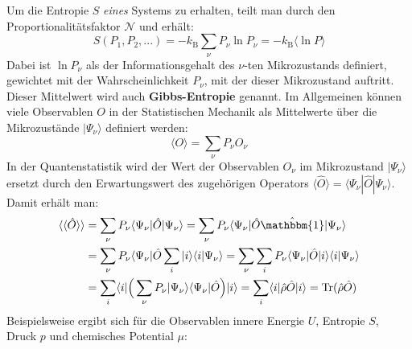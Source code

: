 \documentclass[9pt]{report}
\begin{document}
Um die Entropie $S$ \textit{eines} Systems zu erhalten, teilt man durch den Proportionalitätsfaktor $\mathcal{N}$ und erhält:
\begin{equation}
S(P_1,P_2,...) =-k_{\mathrm{B}}\sum_{\nu}P_{\nu}\ln P_{\nu}=-k_{\mathrm{B}}\big\langle\ln P\big\rangle\label{Entropy formula}
\end{equation}
Dabei ist $\ln P_{\nu}$ als der Informationsgehalt des $\nu$-ten Mikrozustands definiert, gewichtet mit der Wahrscheinlichkeit $P_{\nu}$, mit der dieser Mikrozustand auftritt. Dieser Mittelwert wird auch \textbf{Gibbs-Entropie} genannt. Im Allgemeinen können viele Observablen $O$ in der Statistischen Mechanik als Mittelwerte über die Mikrozustände $|\Psi_{\nu}\rangle$ definiert werden:
\begin{equation}
\langle O\rangle = \sum_{\nu}P_{\nu}O_{\nu}
\end{equation}
In der Quantenstatistik wird der Wert der Observablen $O_{\nu}$ im Mikrozustand $|\Psi_{\nu}\rangle$ ersetzt durch den Erwartungswert des zugehörigen Operators $\langle\hat{O}\rangle=\langle\Psi_{\nu}|\hat{O}|\Psi_{\nu}\rangle$. Damit erhält man:
\begin{align}
\langle\langle\hat{O}\rangle\rangle &= \sum_{\nu}P_{\nu}\langle\Psi_{\nu}|\hat{O}|\Psi_{\nu}\rangle = \sum_{\nu}P_{\nu}\langle\Psi_{\nu}|\hat{O}\hat{\mathbbm{1}}|\Psi_{\nu}\rangle\\
&= \sum_{\nu}P_{\nu}\langle\Psi_{\nu}|\hat{O}\sum_{i}|i\rangle\langle i|\Psi_{\nu}\rangle= \sum_{\nu}\sum_{i}P_{\nu}\langle\Psi_{\nu}|\hat{O}|i\rangle\langle i|\Psi_{\nu}\rangle\\
&= \sum_{i}\langle i|\Big(\sum_{\nu}P_{\nu}|\Psi_{\nu}\rangle\langle\Psi_{\nu}|\hat{O}\Big)|i\rangle= \sum_{i}\langle i|\hat{\rho}\hat{O}|i\rangle = \mathrm{Tr}(\hat{\rho}\hat{O})
\end{align}
Beispielsweise ergibt sich für die Observablen innere Energie $U$, Entropie $S$, Druck $p$ und chemisches Potential $\mu$:
\end{document}
